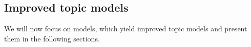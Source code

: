 \documentclass[
        a4paper,
        titlepage,
        twoside,
        parskip
        ]{scrbook}
\makeatletter
\newcommand{\cmark}{\ding{51}}
\newcommand{\specialcell}[2][c]{%
   \begin{tabular}[#1]{@{}c@{}}#2\end{tabular}}
\theoremstyle{break}
\makeatother
\begin{document}

\subsection{Improved topic models}

We will now focus on models, which yield improved topic models and present them in the following sections.
\end{document}
